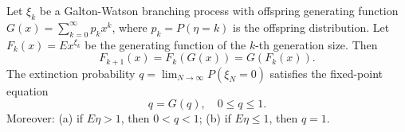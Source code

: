 Let $\xi_k$ be a Galton-Watson branching process with offspring generating function $G(x) = \sum_{k=0}^{\infty} p_k x^k$, where $p_k = P(\eta = k)$ is the offspring distribution. Let $F_k(x) = E x^{\xi_k}$ be the generating function of the $k$-th generation size. Then
$$F_{k+1}(x) = F_k(G(x)) = G(F_k(x)).$$
The extinction probability $q = \lim_{N \to \infty} P(\xi_N = 0)$ satisfies the fixed-point equation
$$q = G(q), \quad 0 \leq q \leq 1.$$
Moreover: (a) if $E\eta > 1$, then $0 < q < 1$; (b) if $E\eta \leq 1$, then $q = 1$.
